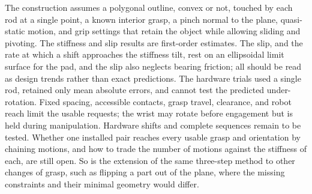 The construction assumes a polygonal outline, convex or not, touched by each rod at a single point, a known interior grasp, a pinch normal to the plane, quasi-static motion, and grip settings that retain the object while allowing sliding and pivoting. The stiffness and slip results are first-order estimates. The slip, and the rate at which a shift approaches the stiffness tilt, rest on an ellipsoidal limit surface for the pad, and the slip also neglects bearing friction; all should be read as design trends rather than exact predictions. The hardware trials used a single rod, retained only mean absolute errors, and cannot test the predicted under-rotation. Fixed spacing, accessible contacts, grasp travel, clearance, and robot reach limit the usable requests; the wrist may rotate before engagement but is held during manipulation. Hardware shifts and complete sequences remain to be tested. Whether one installed pair reaches every usable grasp and orientation by chaining motions, and how to trade the number of motions against the stiffness of each, are still open. So is the extension of the same three-step method to other changes of grasp, such as flipping a part out of the plane, where the missing constraints and their minimal geometry would differ.
